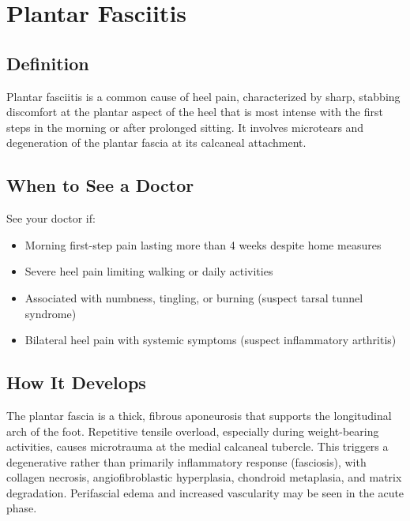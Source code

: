 \chapter{Plantar Fasciitis}

\section*{Definition}
Plantar fasciitis is a common cause of heel pain, characterized by sharp, stabbing discomfort at the plantar aspect of the heel that is most intense with the first steps in the morning or after prolonged sitting. It involves microtears and degeneration of the plantar fascia at its calcaneal attachment.

\section*{When to See a Doctor}
See your doctor if:
\begin{itemize}
  \item Morning first-step pain lasting more than 4 weeks despite home measures
  \item Severe heel pain limiting walking or daily activities
  \item Associated with numbness, tingling, or burning (suspect tarsal tunnel syndrome)
  \item Bilateral heel pain with systemic symptoms (suspect inflammatory arthritis)
\end{itemize}

\section*{How It Develops}
The plantar fascia is a thick, fibrous aponeurosis that supports the longitudinal arch of the foot. Repetitive tensile overload, especially during weight-bearing activities, causes microtrauma at the medial calcaneal tubercle. This triggers a degenerative rather than primarily inflammatory response (fasciosis), with collagen necrosis, angiofibroblastic hyperplasia, chondroid metaplasia, and matrix degradation. Perifascial edema and increased vascularity may be seen in the acute phase.

